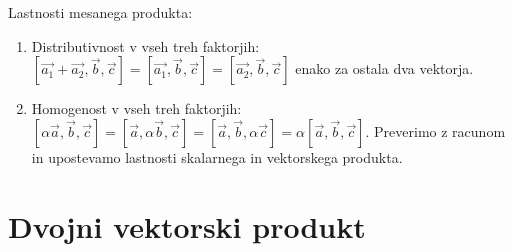 \documentclass{report}
\begin{document}
Lastnosti mesanega produkta:

\begin{enumerate}
	\item Distributivnost v vseh treh faktorjih:
		$\left[ \vec{a_1} + \vec{a_2}, \vec{b}, \vec{c} \right] =  \left[  \vec{a_1},\vec{b}, \vec{c}  \right] = \left[  \vec{a_2} , \vec{b}, \vec{c} \right]  $
		enako za ostala dva vektorja.
	\item Homogenost v vseh treh faktorjih: $\left[  \alpha \vec{a}, \vec{b} , \vec{c}  \right] = \left[  \vec{a}, \alpha \vec{b}, \vec{c}  \right] = \left[  \vec{a}, \vec{b} , \alpha \vec{c}  \right]   = \alpha \left[  \vec{a} , \vec{b} , \vec{c}  \right] $. Preverimo z racunom in upostevamo lastnosti skalarnega in vektorskega produkta.
\end{enumerate}


\section{Dvojni vektorski produkt}
\end{document}
